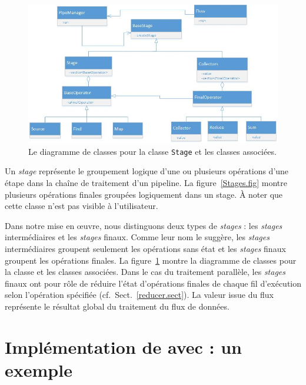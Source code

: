 \begin{figure}
\centering
     \includegraphics[width=1.0\textwidth]{Figures/StagesClassDiagramme.jpg}
      \caption{Le diagramme de classes pour la classe \texttt{Stage} et les classes associ\'ees.}
       \label{StagesClassDiagramme.fig}
\end{figure}


Un \emph{stage} repr\'esente le groupement logique d'une ou plusieurs op\'erations d'une \'etape dans la cha\^ine de traitement d'un pipeline. La figure~\ref{Stages.fig} montre plusieurs op\'erations finales group\'ees logiquement dans un stage.  \`A noter que cette classe n'est pas visible \`a l'utilisateur. 

Dans notre mise en \oe{}uvre, nous distinguons deux types de \emph{stages} : les \emph{stages} interm\'ediaires et les \emph{stages} finaux. Comme leur nom le sugg\`ere, les \emph{stages} interm\'ediaires groupent seulement les op\'erations sans \'etat et les \emph{stages} finaux groupent les op\'erations finales. La figure~\ref{StagesClassDiagramme.fig} montre la diagramme de classes pour la classe  et les classes associ\'ees. Dans le cas du traitement parall\`ele, les \emph{stages} finaux ont pour r\^ole de r\'eduire l'\'etat d'op\'erations finales de chaque fil d'ex\'ecution selon l'op\'eration sp\'ecifi\'ee (cf.~Sect.~\ref{reducer.sect}). La valeur issue du flux repr\'esente le r\'esultat global du traitement du flux de donn\'ees.



\section{Impl\'ementation de  avec  : un exemple}

